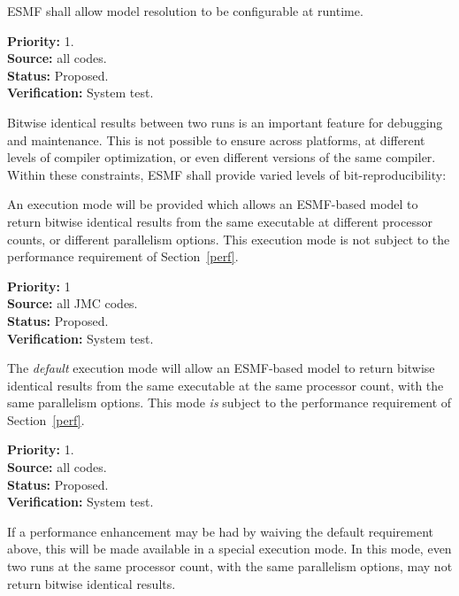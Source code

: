 ESMF shall allow model resolution to be configurable at runtime.
\begin{reqlist}
{\bf Priority:} 1. \\
{\bf Source:} all codes. \\
{\bf Status:} Proposed. \\
{\bf Verification:} System test.
\end{reqlist}


Bitwise identical results between two runs is an important feature for
debugging and maintenance. This is not possible to ensure across
platforms, at different levels of compiler optimization, or even
different versions of the same compiler. Within these constraints,
ESMF shall provide varied levels of bit-reproducibility:


An execution mode will be provided which allows an ESMF-based model to
return bitwise identical results from the same executable at different
processor counts, or different parallelism options. This execution
mode is not subject to the performance requirement of Section~\ref{perf}.

\begin{reqlist}
{\bf Priority:} 1 \\
{\bf Source:} all JMC codes. \\
{\bf Status:} Proposed. \\
{\bf Verification:} System test.
\end{reqlist}


The \emph{default} execution mode will allow an ESMF-based model to
return bitwise identical results from the same executable at the same
processor count, with the same parallelism options. This mode
\emph{is} subject to the performance requirement of
Section~\ref{perf}.

\begin{reqlist}
{\bf Priority:} 1.\\
{\bf Source:} all codes. \\
{\bf Status:} Proposed. \\
{\bf Verification:} System test.
\end{reqlist}


If a performance enhancement may be had by waiving the default
requirement above, this will be made available in a special execution
mode. In this mode, even two runs at the same processor count, with
the same parallelism options, may not return bitwise identical
results.


